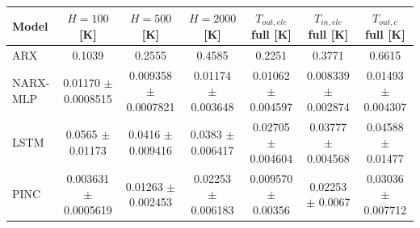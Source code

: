 \begin{tabular}{lcccccc}
\toprule
Model & $H=100$ [K] & $H=500$ [K] & $H=2000$ [K] & $T_{out,ele}$ full [K] & $T_{in,ele}$ full [K] & $T_{out,c}$ full [K] \\
\midrule
ARX & 0.1039 & 0.2555 & 0.4585 & 0.2251 & 0.3771 & 0.6615 \\
NARX-MLP & 0.01170 $\pm$ 0.0008515 & 0.009358 $\pm$ 0.0007821 & 0.01174 $\pm$ 0.003648 & 0.01062 $\pm$ 0.004597 & 0.008339 $\pm$ 0.002874 & 0.01493 $\pm$ 0.004307 \\
LSTM & 0.0565 $\pm$ 0.01173 & 0.0416 $\pm$ 0.009416 & 0.0383 $\pm$ 0.006417 & 0.02705 $\pm$ 0.004604 & 0.03777 $\pm$ 0.004568 & 0.04588 $\pm$ 0.01477 \\
PINC & 0.003631 $\pm$ 0.0005619 & 0.01263 $\pm$ 0.002453 & 0.02253 $\pm$ 0.006183 & 0.009570 $\pm$ 0.00356 & 0.02253 $\pm$ 0.0067 & 0.03036 $\pm$ 0.007712 \\
\bottomrule
\end{tabular}
